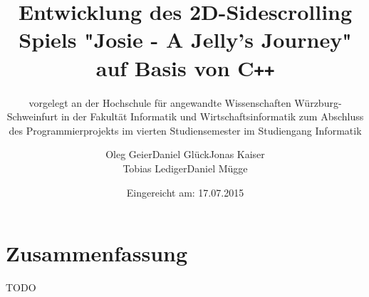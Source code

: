 \documentclass[12pt,oneside,a4paper,parskip]{scrbook}
\def\BaAuthor{Oleg Geier\qquad Daniel Glück\qquad Jonas Kaiser \\Tobias Lediger\qquad Daniel Mügge}
\def\BaTitle{Entwicklung des 2D-Sidescrolling Spiels "Josie - A Jelly's Journey" auf Basis von C\texttt{++}}
\def\BaSupervisorOne{Prof.\ Dr.\ Peter Braun}
\def\BaSupervisorTwo{Prof.\ Dr.\ Steffen Heinzl}
\def\BaDeadline{17.07.2015}
\begin{document}


\frontmatter
\titlehead{%
  {Hochschule für angewandte Wissenschaften Würzburg-Schweinfurt\\
   Fakultät Informatik und Wirtschaftsinformatik}}
\subject{Projektdokumentation}
\title{\BaTitle\\[15mm]}
\subtitle{\normalsize{vorgelegt an der Hochschule f\"{u}r angewandte Wissenschaften W\"{u}rzburg-Schweinfurt in der Fakult\"{a}t Informatik und Wirtschaftsinformatik zum Abschluss des Programmierprojekts im vierten Studiensemester im Studiengang Informatik}}
\author{\BaAuthor}
\date{\normalsize{Eingereicht am: \BaDeadline}}
\publishers{
  \normalsize{Erstpr\"{u}fer: \BaSupervisorOne}\\
  \normalsize{Zweitpr\"{u}fer: \BaSupervisorTwo}\\
}


\maketitle



\section*{Zusammenfassung}

TODO

\tableofcontents										



\mainmatter







%

\backmatter

\listoffigures
{}			

\listoftables

\lstlistoflistings
{}				

\printbibliography
{}				
\end{document}
